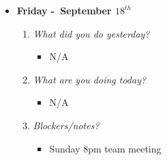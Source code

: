 \begin{itemize}
  \item[] \textbf{\large Friday -\ September \(18^{th}\)}
  \begin{enumerate}
    \item \textsl{What did you do yesterday?}
    \begin{itemize}
      \item N/A
    \end{itemize}
    \item \textsl{What are you doing today?}
    \begin{itemize}
      \item N/A
    \end{itemize}
    \item \textsl{Blockers/notes?}
    \begin{itemize}
      \item Sunday 8pm team meeting
    \end{itemize}
  \end{enumerate}
\end{itemize}